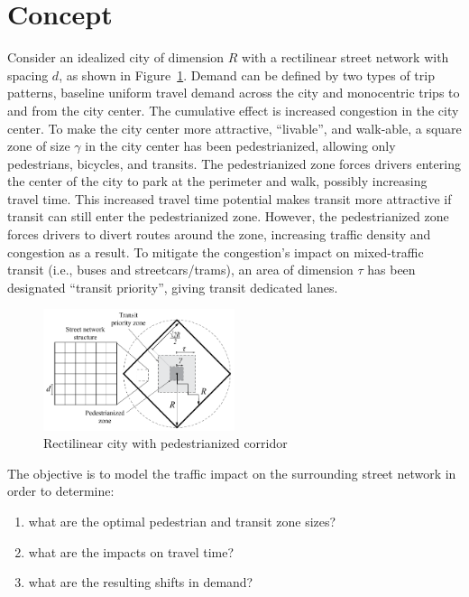 \documentclass{article}
\begin{document}
\section{Concept}
Consider an idealized city of dimension $R$ with a rectilinear street network with spacing $d$, as shown in Figure~\ref{fig:gridcity}. Demand can be defined by two types of trip patterns, baseline uniform travel demand across the city and monocentric trips to and from the city center. The cumulative effect is increased congestion in the city center. To make the city center more attractive, ``livable'', and walk-able, a square zone of size $\gamma$ in the city center has been pedestrianized, allowing only pedestrians, bicycles, and transits. The pedestrianized zone forces drivers entering the center of the city to park at the perimeter and walk, possibly increasing travel time. This increased travel time potential makes transit more attractive if transit can still enter the pedestrianized zone. However, the pedestrianized zone forces drivers to divert routes around the zone, increasing traffic density and congestion as a result. To mitigate the congestion's impact on mixed-traffic transit (i.e., buses and streetcars/trams), an area of dimension $\tau$ has been designated ``transit priority'', giving transit dedicated lanes. 

\begin{figure}[!ht]
     \centering
     \includegraphics[width=0.5\textwidth]{diagram_pedtransit_grid_city}
     \caption{Rectilinear city with pedestrianized corridor}
     \label{fig:gridcity}
\end{figure}

\noindent The objective is to model the traffic impact on the surrounding street network in order to determine:
\begin{enumerate}[topsep=3pt, itemsep=3pt, partopsep=3pt, parsep=3pt]
    \itshape
    \item what are the optimal pedestrian and transit zone sizes?
    \item what are the impacts on travel time?
    \item what are the resulting shifts in demand?
\end{enumerate}
\end{document}
